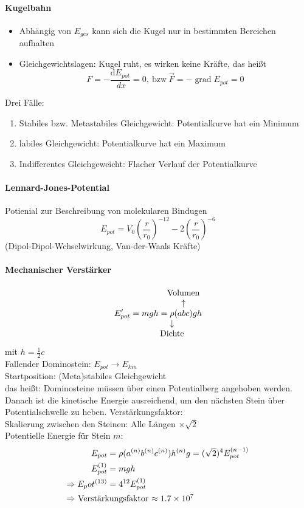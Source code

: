 \documentclass[a4paper]{scrartcl}
\DeclareMathOperator{\grad}{grad}
\renewcommand{\d}{\mathrm{d}}
\renewcommand{\v}[1]{\vec{#1}}
\newcommand{\dd}[2]{\frac{\d #1}{\ d#2}}
\theoremstyle{definition}
\theoremstyle{plain}
\theoremstyle{plain}
\theoremstyle{remark}
\theoremstyle{remark}
\theoremstyle{remark}
\begin{document}
\paragraph{Kugelbahn}
\label{sec-5-1-3-1}
\begin{itemize}
\item Abhängig von $E_{ges}$ kann sich die Kugel nur in bestimmten Bereichen aufhalten
\item Gleichgewichtslagen: Kugel ruht, es wirken keine Kräfte, das heißt
\[F = -\dd{E_{pot}}{x} = 0, ~\text{bzw}~ \v F = -\grad E_{pot} = 0\]
\end{itemize}

Drei Fälle:
\begin{enumerate}
\item Stabiles bzw. Metastabiles Gleichgewicht: Potentialkurve hat ein Minimum
\item labiles Gleichgewicht: Potentialkurve hat ein Maximum
\item Indifferentes Gleichgeweicht: Flacher Verlauf der Potentialkurve
\end{enumerate}
\paragraph{Lennard-Jones-Potential}
\label{sec-5-1-3-2}
Potienial zur Beschreibung von molekularen Bindugen
\[E_{pot} = V_0 (\frac{r}{r_0})^{-12} - 2(\frac{r}{r_0})^{-6}\]
(Dipol-Dipol-Wchselwirkung, Van-der-Waals Kräfte)
\paragraph{Mechanischer Verstärker}
\label{sec-5-1-3-3}
\[E_{pot}' = m g h = \underarrow[\rho]{Dichte} \overarrow[(a b c)]{Volumen} g h\]
mit $h = \frac{1}{2}c$ \\
     Fallender Dominostein: $E_{pot}  \to E_{kin}$ \\
     Startposition: (Meta)stabiles Gleichgewicht \\
     das heißt: Dominosteine müssen über einen Potentialberg angehoben werden. Danach ist die kinetische Energie
ausreichend, um den nächsten Stein über Potentialschwelle zu heben.
Verstärkungsfaktor: \\
     Skalierung zwischen den Steinen: Alle Längen $\times \sqrt{2}$ \\
     Potentielle Energie für Stein $m$:
\begin{align*}
E_{pot} &= \rho(a^{(n)}b^{(n)}c^{(n)}) h^{(n)} g = (\sqrt{2})^4 E_{pot}^{(n-1)} \\
E_{pot}^{(1)} &= m g h \\
\Rightarrow E_pot^{(13)} &= 4^{12} E_{pot}^{(1)} \\
\intertext{$\Rightarrow$ Verstärkungsfaktor $\approx \SI{1.7e7}{}$}
\end{align*}
\end{document}
